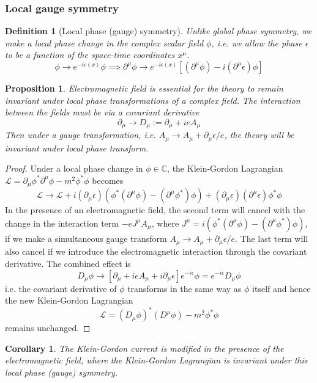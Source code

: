 \documentclass[a4paper]{article}
\theoremstyle{new}
\newtheorem{defi}{Definition}[section]
\newtheorem{prop}{Proposition}[section]
\newtheorem{cor}{Corollary}[section]
\begin{document}
\subsubsection{Local gauge symmetry}
\begin{defi}[Local phase (gauge) symmetry]
Unlike global phase symmetry, we make a local phase change in the complex scalar field $\phi$, i.e. we allow the phase $\epsilon$ to be a function of the space-time coordinates $x^\mu$.
$$\phi\rightarrow e^{-i\epsilon(x)}\phi\implies\partial^\mu\phi\rightarrow e^{-i\epsilon(x)}[(\partial^\mu\phi)-i(\partial^\mu\epsilon)\phi]$$
\end{defi}
\begin{prop}
Electromagnetic field is essential for the theory to remain invariant under local phase transformations of a complex field. The interaction between the fields must be via a covariant derivative
$$\partial_\mu\rightarrow D_\mu:=\partial_\mu+ieA_\mu$$
Then under a gauge transformation, i.e. $A_\mu\rightarrow A_\mu+\partial_\mu\epsilon/e$, the theory will be invariant under local phase transform.
\end{prop}
\begin{proof}
Under a local phase change in $\phi\in\mathbb{C}$, the Klein-Gordon Lagrangian $\mathcal{L}=\partial_\mu\phi^*\partial^\mu\phi-m^2\phi^*\phi$ becomes
$$\mathcal{L}\rightarrow\mathcal{L}+i(\partial_\mu\epsilon)(\phi^*(\partial^\mu\phi)-(\partial^\mu\phi^*)\phi)+(\partial_\mu\epsilon)(\partial^\mu\epsilon)\phi^*\phi$$
In the presence of an electromagnetic field, the second term will cancel with the change in the interaction term $-eJ^\mu A_\mu$, where $J^\mu=i(\phi^*(\partial^\mu\phi)-(\partial^\mu\phi^*)\phi)$, if we make a simultaneous gauge transform $A_\mu\rightarrow A_\mu+\partial_\mu\epsilon/e$. The last term will also cancel if we introduce the electromagnetic interaction through the covariant derivative. The combined effect is
$$D_\mu\phi\rightarrow[\partial_\mu+ieA_\mu+i\partial_\mu\epsilon]e^{-i\epsilon}\phi=e^{-i\epsilon}D_\mu\phi$$
i.e. the covariant derivative of $\phi$ transforms in the same way as $\phi$ itself and hence the new Klein-Gordon Lagrangian 
$$\mathcal{L}=(D_\mu\phi)^*(D^\mu\phi)-m^2\phi^*\phi$$
remains unchanged.
\end{proof}
\begin{cor}
The Klein-Gordon current is modified in the presence of the electromagnetic field, where the Klein-Gordon Lagrangian is invariant under this local phase (gauge) symmetry.
\end{cor}
\end{document}
